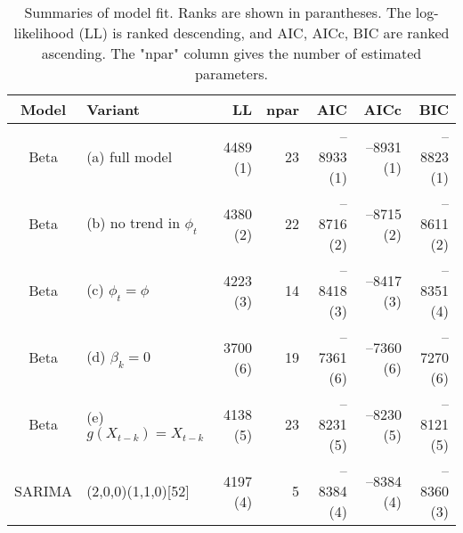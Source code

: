 \begin{table}[ht]
\centering
\begin{tabular}{cl|rrrrr}
  \hline
Model & Variant & LL & npar & AIC & AICc & BIC \\ 
  \hline
Beta & (a) full model & 4489 (1) & 23 & --8933 (1) & --8931 (1) & --8823 (1) \\ 
  Beta & (b) no trend in $\phi_t$ & 4380 (2) & 22 & --8716 (2) & --8715 (2) & --8611 (2) \\ 
  Beta & (c) $\phi_t = \phi$ & 4223 (3) & 14 & --8418 (3) & --8417 (3) & --8351 (4) \\ 
  Beta & (d) $\beta_k = 0$ & 3700 (6) & 19 & --7361 (6) & --7360 (6) & --7270 (6) \\ 
  Beta & (e) $g(X_{t-k}) = X_{t-k}$ & 4138 (5) & 23 & --8231 (5) & --8230 (5) & --8121 (5) \\ 
   \hline
SARIMA & (2,0,0)(1,1,0)[52] & 4197 (4) & 5 & --8384 (4) & --8384 (4) & --8360 (3) \\ 
   \hline
\end{tabular}
\caption{Summaries of model fit.
             Ranks are shown in parantheses.
             The log-likelihood (LL) is ranked descending,
             and AIC, AICc, BIC are ranked ascending.
             The "npar" column gives the number of estimated parameters.} 
\label{tab:wILIsum}
\end{table}
